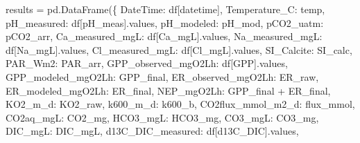 \documentclass[
  letterpaper,
  DIV=11,
  numbers=noendperiod]{scrartcl}
\newenvironment{Shaded}{\begin{snugshade}}{\end{snugshade}}
\newcommand{\NormalTok}[1]{\textcolor[rgb]{0.00,0.23,0.31}{#1}}
\newcommand{\OperatorTok}[1]{\textcolor[rgb]{0.37,0.37,0.37}{#1}}
\newcommand{\StringTok}[1]{\textcolor[rgb]{0.13,0.47,0.30}{#1}}
\begin{document}
\begin{Shaded}
\begin{Highlighting}[]
\NormalTok{results }\OperatorTok{=}\NormalTok{ pd.DataFrame(\{}
    \StringTok{\textquotesingle{}DateTime\textquotesingle{}}\NormalTok{: df[}\StringTok{\textquotesingle{}datetime\textquotesingle{}}\NormalTok{], }\StringTok{\textquotesingle{}Temperature\_C\textquotesingle{}}\NormalTok{: temp,}
    \StringTok{\textquotesingle{}pH\_measured\textquotesingle{}}\NormalTok{: df[}\StringTok{\textquotesingle{}pH\_meas\textquotesingle{}}\NormalTok{].values, }\StringTok{\textquotesingle{}pH\_modeled\textquotesingle{}}\NormalTok{: pH\_mod,}
    \StringTok{\textquotesingle{}pCO2\_uatm\textquotesingle{}}\NormalTok{: pCO2\_arr,}
    \StringTok{\textquotesingle{}Ca\_measured\_mgL\textquotesingle{}}\NormalTok{: df[}\StringTok{\textquotesingle{}Ca\_mgL\textquotesingle{}}\NormalTok{].values,}
    \StringTok{\textquotesingle{}Na\_measured\_mgL\textquotesingle{}}\NormalTok{: df[}\StringTok{\textquotesingle{}Na\_mgL\textquotesingle{}}\NormalTok{].values,}
    \StringTok{\textquotesingle{}Cl\_measured\_mgL\textquotesingle{}}\NormalTok{: df[}\StringTok{\textquotesingle{}Cl\_mgL\textquotesingle{}}\NormalTok{].values,}
    \StringTok{\textquotesingle{}SI\_Calcite\textquotesingle{}}\NormalTok{: SI\_calc, }\StringTok{\textquotesingle{}PAR\_Wm2\textquotesingle{}}\NormalTok{: PAR\_arr,}
    \StringTok{\textquotesingle{}GPP\_observed\_mgO2Lh\textquotesingle{}}\NormalTok{: df[}\StringTok{\textquotesingle{}GPP\textquotesingle{}}\NormalTok{].values,}
    \StringTok{\textquotesingle{}GPP\_modeled\_mgO2Lh\textquotesingle{}}\NormalTok{: GPP\_final,}
    \StringTok{\textquotesingle{}ER\_observed\_mgO2Lh\textquotesingle{}}\NormalTok{: ER\_raw, }\StringTok{\textquotesingle{}ER\_modeled\_mgO2Lh\textquotesingle{}}\NormalTok{: ER\_final,}
    \StringTok{\textquotesingle{}NEP\_mgO2Lh\textquotesingle{}}\NormalTok{: GPP\_final }\OperatorTok{+}\NormalTok{ ER\_final,}
    \StringTok{\textquotesingle{}KO2\_m\_d\textquotesingle{}}\NormalTok{: KO2\_raw, }\StringTok{\textquotesingle{}k600\_m\_d\textquotesingle{}}\NormalTok{: k600\_b,}
    \StringTok{\textquotesingle{}CO2flux\_mmol\_m2\_d\textquotesingle{}}\NormalTok{: flux\_mmol,}
    \StringTok{\textquotesingle{}CO2aq\_mgL\textquotesingle{}}\NormalTok{: CO2\_mg, }\StringTok{\textquotesingle{}HCO3\_mgL\textquotesingle{}}\NormalTok{: HCO3\_mg, }\StringTok{\textquotesingle{}CO3\_mgL\textquotesingle{}}\NormalTok{: CO3\_mg,}
    \StringTok{\textquotesingle{}DIC\_mgL\textquotesingle{}}\NormalTok{: DIC\_mgL,}
    \StringTok{\textquotesingle{}d13C\_DIC\_measured\textquotesingle{}}\NormalTok{: df[}\StringTok{\textquotesingle{}d13C\_DIC\textquotesingle{}}\NormalTok{].values,}

\end{Highlighting}
\end{Shaded}
\end{document}
